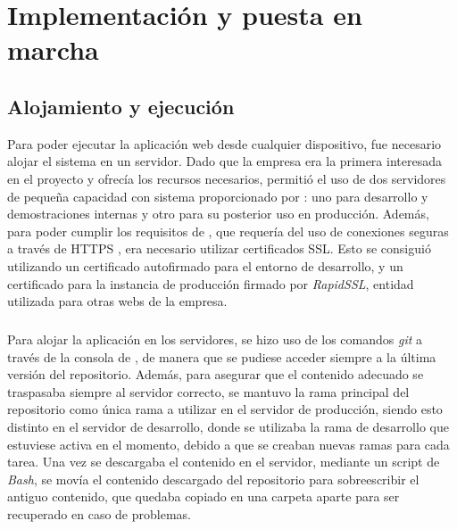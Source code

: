 \documentclass{subfiles}
\begin{document}
    \chapter{Implementación y puesta en marcha}
    \label{chap:5}

    \section{Alojamiento y ejecución}
    \label{sec:alojamiento_y_ejecucion}
    Para poder ejecutar la aplicación web desde cualquier dispositivo, fue necesario alojar el sistema en un servidor. Dado que la empresa \silverstorm era la primera interesada en el proyecto y ofrecía los recursos necesarios, permitió el uso de dos servidores de pequeña capacidad con sistema \linux proporcionado por \aws: uno para desarrollo y demostraciones internas y otro para su posterior uso en producción. Además, para poder cumplir los requisitos de \webxr, que requería del uso de conexiones seguras a través de HTTPS \cite{web:webxrrequirements}, era necesario utilizar certificados SSL. Esto se consiguió utilizando un certificado autofirmado para el entorno de desarrollo, y un certificado para la instancia de producción firmado por \textit{RapidSSL}, entidad utilizada para otras webs de la empresa.

    \paragraph{}
    Para alojar la aplicación en los servidores, se hizo uso de los comandos \textit{git} a través de la consola de \linux, de manera que se pudiese acceder siempre a la última versión del repositorio. Además, para asegurar que el contenido adecuado se traspasaba siempre al servidor correcto, se mantuvo la rama principal del repositorio como única rama a utilizar en el servidor de producción, siendo esto distinto en el servidor de desarrollo, donde se utilizaba la rama de desarrollo que estuviese activa en el momento, debido a que se creaban nuevas ramas para cada tarea. Una vez se descargaba el contenido en el servidor, mediante un script de \textit{Bash}, se movía el contenido descargado del repositorio para sobreescribir el antiguo contenido, que quedaba copiado en una carpeta aparte para ser recuperado en caso de problemas.
\end{document}
